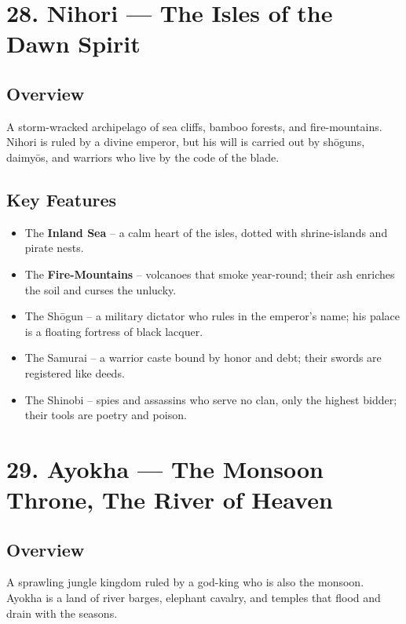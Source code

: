 \documentclass[11pt]{article}
\begin{document}
\section*{28. Nihori --- The Isles of the Dawn Spirit}

\subsection*{Overview}
A storm-wracked archipelago of sea cliffs, bamboo forests, and fire-mountains. Nihori is ruled by a divine emperor, but his will is carried out by shōguns, daimyōs, and warriors who live by the code of the blade.

\subsection*{Key Features}
\begin{itemize}[leftmargin=*]
    \item The \textbf{Inland Sea} -- a calm heart of the isles, dotted with shrine-islands and pirate nests.
    \item The \textbf{Fire-Mountains} -- volcanoes that smoke year-round; their ash enriches the soil and curses the unlucky.
    \item The Shōgun -- a military dictator who rules in the emperor's name; his palace is a floating fortress of black lacquer.
    \item The Samurai -- a warrior caste bound by honor and debt; their swords are registered like deeds.
    \item The Shinobi -- spies and assassins who serve no clan, only the highest bidder; their tools are poetry and poison.
\end{itemize}

\section*{29. Ayokha --- The Monsoon Throne, The River of Heaven}

\subsection*{Overview}
A sprawling jungle kingdom ruled by a god-king who is also the monsoon. Ayokha is a land of river barges, elephant cavalry, and temples that flood and drain with the seasons.
\end{document}
